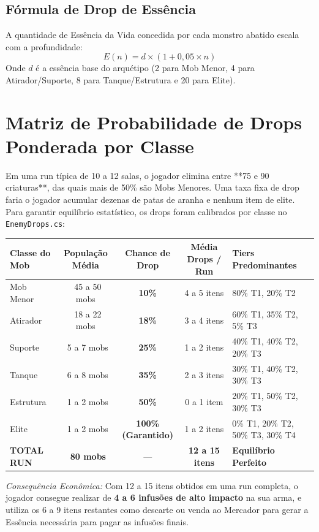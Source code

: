 \documentclass[a4paper,12pt]{report}
\begin{document}
\subsection{Fórmula de Drop de Essência}
A quantidade de Essência da Vida concedida por cada monstro abatido escala com a profundidade:
\[
E(n) = d \times (1 + 0{,}05 \times n)
\]
Onde $d$ é a essência base do arquétipo (2 para Mob Menor, 4 para Atirador/Suporte, 8 para Tanque/Estrutura e 20 para Elite).

\section{Matriz de Probabilidade de Drops Ponderada por Classe}
Em uma run típica de 10 a 12 salas, o jogador elimina entre **75 e 90 criaturas**, das quais mais de 50\% são Mobs Menores. Uma taxa fixa de drop faria o jogador acumular dezenas de patas de aranha e nenhum item de elite. Para garantir equilíbrio estatístico, os drops foram calibrados por classe no \texttt{EnemyDrops.cs}:

\begin{center}
\begin{tabular}{|l|c|c|c|l|}
    \hline
    \textbf{Classe do Mob} & \textbf{População Média} & \textbf{Chance de Drop} & \textbf{Média Drops / Run} & \textbf{Tiers Predominantes} \\
    \hline
    Mob Menor & ~45 a 50 mobs & \textbf{10\%} & 4 a 5 itens & 80\% T1, 20\% T2 \\
    Atirador  & ~18 a 22 mobs & \textbf{18\%} & 3 a 4 itens & 60\% T1, 35\% T2, 5\% T3 \\
    Suporte   & ~5 a 7 mobs   & \textbf{25\%} & 1 a 2 itens & 40\% T1, 40\% T2, 20\% T3 \\
    Tanque    & ~6 a 8 mobs   & \textbf{35\%} & 2 a 3 itens & 30\% T1, 40\% T2, 30\% T3 \\
    Estrutura & ~1 a 2 mobs   & \textbf{50\%} & 0 a 1 item  & 20\% T1, 50\% T2, 30\% T3 \\
    Elite     & ~1 a 2 mobs   & \textbf{100\% (Garantido)} & 1 a 2 itens & 0\% T1, 20\% T2, 50\% T3, 30\% T4 \\
    \hline
    \textbf{TOTAL RUN} & \textbf{~80 mobs} & --- & \textbf{12 a 15 itens} & \textbf{Equilíbrio Perfeito} \\
    \hline
\end{tabular}
\end{center}

\textit{Consequência Econômica:} Com 12 a 15 itens obtidos em uma run completa, o jogador consegue realizar de \textbf{4 a 6 infusões de alto impacto} na sua arma, e utiliza os 6 a 9 itens restantes como descarte ou venda ao Mercador para gerar a Essência necessária para pagar as infusões finais.
\end{document}
